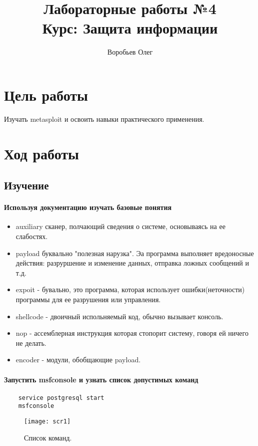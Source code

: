 \documentclass{article}
\title{Лабораторные работы №4 \\ Курс: Защита информации}
\author{Воробьев Олег}
\begin{document}
 	\maketitle
 	\clearpage
 	\tableofcontents
 	\clearpage
 	
 \section{Цель работы}
 Изучать metasploit и освоить навыки практического применения.
 \section{Ход работы}
 \subsection{Изучение}
 \paragraph{Используя документацию изучать базовые понятия}
 \begin{itemize}
 	\item auxiliary сканер, полчающий сведения о системе, основываясь на ее слабостях.
 	\item payload буквально "полезная нарузка". Эа программа выполняет вредоносные действия: разруршение и изменение данных, отправка ложных сообщений и т.д.
 	\item expoit - бувально, это программа, которая использует ошибки(неточности) программы для ее разрушения или управления.
 	\item shellcode - двоичный испольняемый код, обычно вызывает консоль.
 	\item nop - ассемблерная инструкция которая стопорит систему, говоря ей ничего не делать.
 	\item encoder - модули, обобщающие payload.
 \end{itemize}
 \paragraph{Запустить msfconsole и узнать список допустимых команд}
 \begin{verbatim}
 	service postgresql start
 	msfconsole
 \end{verbatim}
 \begin{figure}[h!]
 	\centering
 	\texttt{[image: scr1]}
 	\caption{Список команд.}
 \end{figure}
 
\end{document}
